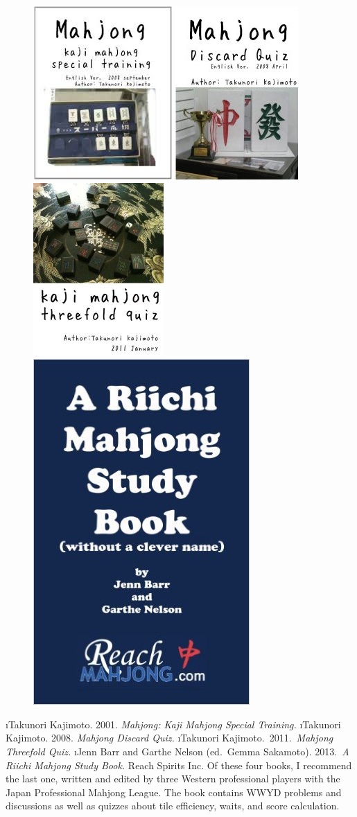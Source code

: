 \begin{figure}
\begin{center}
\includegraphics[height=.33\textwidth,clip]{figs/kaji1}
\includegraphics[height=.33\textwidth,clip]{figs/kaji2}
\includegraphics[height=.33\textwidth,clip]{figs/kaji3}
\includegraphics[height=.33\textwidth,clip]{figs/barr2}
\end{center}
\end{figure}



\be \setcounter{enumi}{1}
\i Takunori Kajimoto. 2001. \textit{Mahjong: Kaji Mahjong Special Training.}
\i Takunori Kajimoto. 2008. \textit{Mahjong Discard Quiz.} 
\i Takunori Kajimoto.~2011.~\textit{Mahjong Threefold Quiz.} 
\i Jenn Barr and Garthe Nelson (ed.~Gemma Sakamoto). 2013.~\textit{A Riichi Mahjong Study Book.} Reach Spirits Inc.
\ee {}
Of these four books, I recommend the last one, written and edited by three Western professional players with the Japan Professional Mahjong League. The book contains WWYD problems and discussions as well as quizzes about tile efficiency, waits, and score calculation. 

